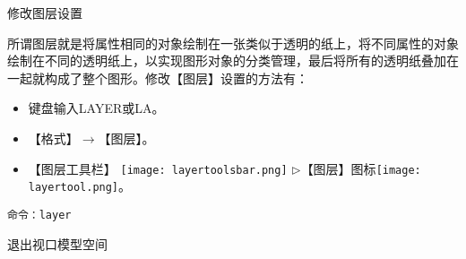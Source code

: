 \begin{procedure}

\item 修改图层设置

所谓图层就是将属性相同的对象绘制在一张类似于透明的纸上，将不同属性的对象绘制在不同的透明纸上，以实现图形对象的分类管理，最后将所有的透明纸叠加在一起就构成了整个图形。修改【图层】设置的方法有：
\begin{itemize}
\item 键盘输入LAYER或LA。
\item 【格式】$\rightarrow$【图层】。
\item 【图层工具栏】 \texttt{[image: layertoolsbar.png]} $\triangleright$【图层】图标\texttt{[image: layertool.png]}。
\end{itemize}
\begin{lstlisting}
命令：layer
\end{lstlisting}
\item 退出视口模型空间


\end{procedure}

\endinput